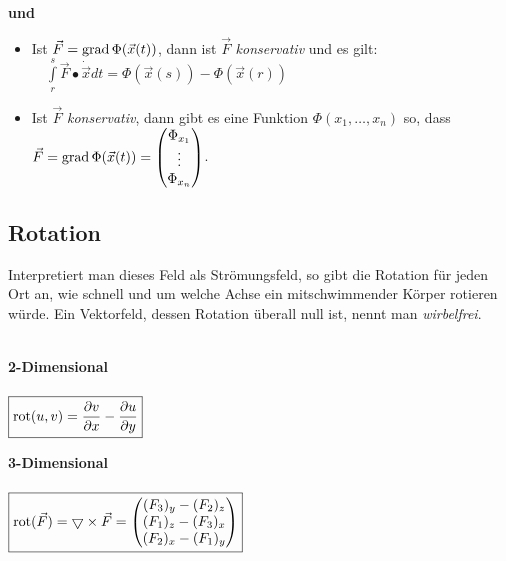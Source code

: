   \textbf{und}
  \begin{itemize}
    \item Ist $\vec{F}=\operatorname{grad} \Phi(\vec{x}(t))$, dann ist $\vec{F}$  
    \textit{konservativ} und es gilt: $\quad\int\limits_r^s \vec{F}\bullet \dot{\vec{x}}
    dt=\Phi(\vec{x}(s))-\Phi(\vec{x}(r))$
    \item Ist $\vec{F}$ \textit{konservativ}, dann gibt es eine Funktion
    $\Phi(x_1,\ldots,x_n)$ so, dass $\vec{F}=\operatorname{grad} \Phi(\vec{x}(t))=
    \begin{pmatrix}
      \Phi_{x_1}\\
      \vdots\\ 
      \Phi_{x_n}
    \end{pmatrix}$.

  \end{itemize}


\subsection{Rotation}
  Interpretiert man dieses Feld als Strömungsfeld, so gibt die Rotation für jeden
  Ort an, wie schnell und um welche Achse ein mitschwimmender Körper rotieren
  würde. Ein Vektorfeld, dessen Rotation überall null ist, nennt man
  \textit{wirbelfrei}.\\\\
  \begin{minipage}{8cm}
    	\textbf{2-Dimensional}\\\\
    	$\boxed{\operatorname{rot}(u,v)=\dfrac{\partial v}{\partial x}-\dfrac{\partial u}{\partial y}}$
  \end{minipage}
  \begin{minipage}{8cm}
	  \textbf{3-Dimensional}\\\\
    	$\boxed{\operatorname{rot}(\vec F)=\bigtriangledown\times\vec{F} = 
    	\begin{pmatrix}
    	  (F_3)_y - (F_2)_z\\
    	  (F_1)_z - (F_3)_x\\
    	  (F_2)_x - (F_1)_y
    	\end{pmatrix}}$
  \end{minipage} \\

